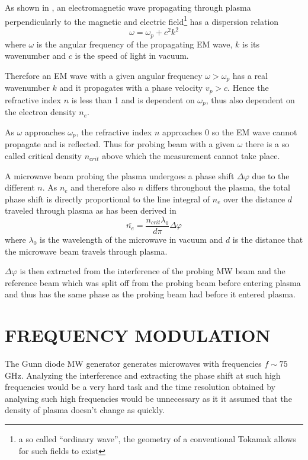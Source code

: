 \documentclass[twoside]{articlek}
\begin{document}
As shown in \cite{mateju}, an electromagnetic wave propagating through plasma perpendicularly to the magnetic and electric field\footnote{a so called ``ordinary wave'', the geometry of a conventional Tokamak allows for such fields to exist} has a dispersion relation
\begin{equation}
    \omega = \omega_p +c^2 k^2
    \label{eq:dispersion}
\end{equation}
where $\omega$ is the angular frequency of the propagating EM wave, $k$ is its wavenumber and $c$ is the speed of light in vacuum.

Therefore an EM wave with a given angular frequency $\omega>\omega_p$ has a real wavenumber $k$ and it propagates with a phase velocity $v_p>c$. Hence the refractive index $n$ is less than 1 and is dependent on $\omega_p$, thus also dependent on the electron density $n_e$. 

As $\omega$ approaches $\omega_p$, the refractive index $n$ approaches 0 so the EM wave cannot propagate and is reflected. Thus for probing beam with a given $\omega$ there is a so called critical density $n_{crit}$ above which the measurement cannot take place.


A microwave beam probing the plasma undergoes a phase shift $\Delta \varphi$ due to the different $n$.  %
As $n_e$ and therefore also $n$ differs throughout the plasma, the total phase shift is directly proportional to the line integral of $n_e$ over the distance $d$ traveled through plasma as has been derived in \cite{mateju}
\begin{equation}
    \overline{n_e}=\frac{ n_{crit}\lambda_0 }{d \pi}\Delta \varphi
    \label{eq:ne}
\end{equation}
where $\lambda_0$ is the wavelength of the microwave in vacuum and $d$ is the distance that the microwave beam travels through plasma. 

$\Delta \varphi$ is then extracted from the interference of the probing MW beam and the reference beam which was split off from the probing beam before entering plasma and thus has the same phase as the probing beam had before it entered plasma.

\section{FREQUENCY MODULATION}

The Gunn diode MW generator generates microwaves with frequencies $f \sim 75$ GHz. Analyzing the interference and extracting the phase shift at such high frequencies would be a very hard task and the time resolution obtained by analysing such high frequencies would be unnecessary as it it assumed that the density of plasma doesn't change as quickly.
\end{document}
